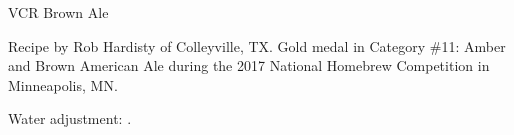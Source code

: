 \begin{recipe}{VCR Brown Ale}

\begin{aboutblock}
Recipe by Rob Hardisty of Colleyville, TX. Gold medal in Category \#11: Amber and
Brown American Ale during the 2017 National Homebrew Competition in Minneapolis, MN.
\sourceaha
\end{aboutblock}


\begin{methodandtiming}

\begin{mashsteps}
\end{mashsteps}

\begin{fermentationsteps}
\end{fermentationsteps}

\begin{directions}
Water adjustment: .
\end{directions}

\end{methodandtiming}

\recipebreak

\begin{ingredientsblock}

\begin{malts}
\end{malts}

\begin{hops}
\end{hops}


\end{ingredientsblock}

\end{recipe}
